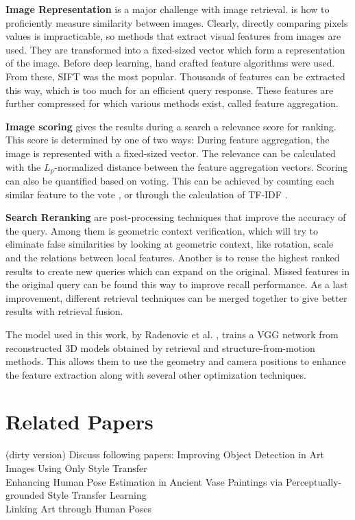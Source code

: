 \textbf{Image Representation} is a major challenge with image retrieval.
 is how to proficiently measure similarity between images.
Clearly, directly comparing pixels values is impracticable, so methods that extract visual features from images are used.
They are transformed into a fixed-sized vector which form a representation of the image.
Before deep learning, hand crafted feature algorithms were used.
From these, \gls{SIFT} \cite{Lowe1999} was the most popular.
Thousands of features can be extracted this way, which is too much for an efficient query response.
These features are further compressed for which various methods exist, called feature aggregation.

\textbf{Image scoring} gives the results during a search a relevance score for ranking.
This score is determined by one of two ways:
During feature aggregation, the image is represented with a fixed-sized vector.
The relevance can be calculated with the $L_p$-normalized distance between the feature aggregation vectors.
Scoring can also be quantified based on voting.
This can be achieved by counting each similar feature to the vote \cite{Zhou2011}, or through the calculation of \gls{TF-IDF} \cite{Zhang2011}.

\textbf{Search Reranking} are post-processing techniques that improve the accuracy of the query.
Among them is geometric context verification, which will try to eliminate false similarities by looking at geometric context, like rotation, scale and the relations between local features.
Another is to reuse the highest ranked results to create new queries which can expand on the original.
Missed features in the original query can be found this way to improve recall performance.
As a last improvement, different retrieval techniques can be merged together to give better results with retrieval fusion.

The model used in this work, by Radenovic et al. \cite{Radenovic2017}, trains a VGG network from reconstructed 3D models obtained by retrieval and structure-from-motion methods.
This allows them to use the geometry and camera positions to enhance the feature extraction along with several other optimization techniques.

\section{Related Papers}
(dirty version)
Discuss following papers:
Improving Object Detection in Art Images Using Only Style Transfer \cite{Kadish2021}\\
Enhancing Human Pose Estimation in Ancient Vase Paintings via Perceptually-grounded Style Transfer Learning \cite{Madhu2020}\\
Linking Art through Human Poses \cite{Jenicek2019}\\